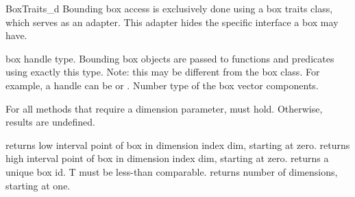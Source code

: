 
\ccRefPageBegin
\begin{ccRefConcept}{BoxTraits_d}
Bounding box access is exclusively done using a box traits class, which serves as an adapter. This adapter hides the specific interface a box may have.

\ccTypes
{} {box handle type. Bounding box objects are passed to functions and predicates using exactly this type. Note: this may be different from the box class. For example, a handle can be  or .}
  {Number type of the box vector components.}



\ccOperations
For all methods that require a dimension parameter,  must hold. Otherwise, results are undefined.

 {returns low interval point of box in dimension index dim, starting at zero.}
 {returns high interval point of box in dimension index dim, starting at zero.}
 {returns a unique box id. T must be less-than comparable.}
 {returns number of dimensions, starting at one.}

\ccHasModels
{}

\end{ccRefConcept}

\ccRefPageEnd
